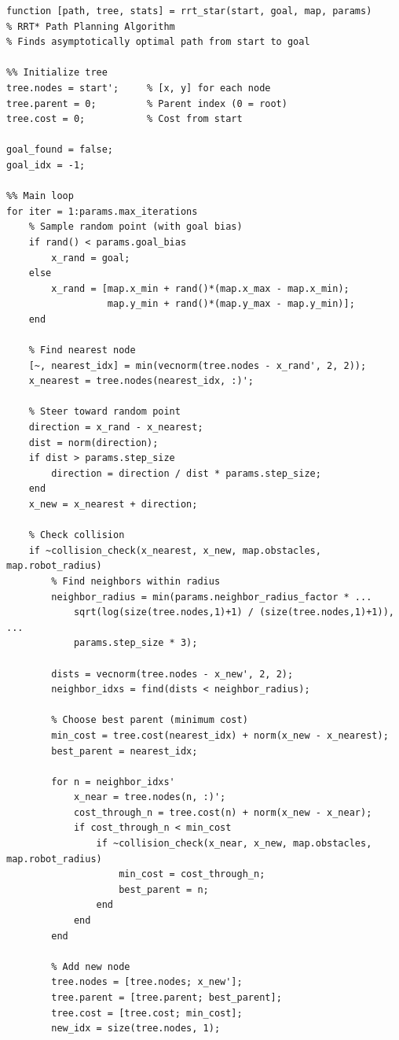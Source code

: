 \documentclass[12pt,a4paper]{scrartcl}
\begin{document}
	\begin{lstlisting}[style=matlabstyle,caption={RRT* Main Function (rrt\_star.m) - Excerpt}]
function [path, tree, stats] = rrt_star(start, goal, map, params)
% RRT* Path Planning Algorithm
% Finds asymptotically optimal path from start to goal

%% Initialize tree
tree.nodes = start';     % [x, y] for each node
tree.parent = 0;         % Parent index (0 = root)
tree.cost = 0;           % Cost from start

goal_found = false;
goal_idx = -1;

%% Main loop
for iter = 1:params.max_iterations
    % Sample random point (with goal bias)
    if rand() < params.goal_bias
        x_rand = goal;
    else
        x_rand = [map.x_min + rand()*(map.x_max - map.x_min);
                  map.y_min + rand()*(map.y_max - map.y_min)];
    end
    
    % Find nearest node
    [~, nearest_idx] = min(vecnorm(tree.nodes - x_rand', 2, 2));
    x_nearest = tree.nodes(nearest_idx, :)';
    
    % Steer toward random point
    direction = x_rand - x_nearest;
    dist = norm(direction);
    if dist > params.step_size
        direction = direction / dist * params.step_size;
    end
    x_new = x_nearest + direction;
    
    % Check collision
    if ~collision_check(x_nearest, x_new, map.obstacles, map.robot_radius)
        % Find neighbors within radius
        neighbor_radius = min(params.neighbor_radius_factor * ...
            sqrt(log(size(tree.nodes,1)+1) / (size(tree.nodes,1)+1)), ...
            params.step_size * 3);
        
        dists = vecnorm(tree.nodes - x_new', 2, 2);
        neighbor_idxs = find(dists < neighbor_radius);
        
        % Choose best parent (minimum cost)
        min_cost = tree.cost(nearest_idx) + norm(x_new - x_nearest);
        best_parent = nearest_idx;
        
        for n = neighbor_idxs'
            x_near = tree.nodes(n, :)';
            cost_through_n = tree.cost(n) + norm(x_new - x_near);
            if cost_through_n < min_cost
                if ~collision_check(x_near, x_new, map.obstacles, map.robot_radius)
                    min_cost = cost_through_n;
                    best_parent = n;
                end
            end
        end
        
        % Add new node
        tree.nodes = [tree.nodes; x_new'];
        tree.parent = [tree.parent; best_parent];
        tree.cost = [tree.cost; min_cost];
        new_idx = size(tree.nodes, 1);
        

\end{lstlisting}
\end{document}
